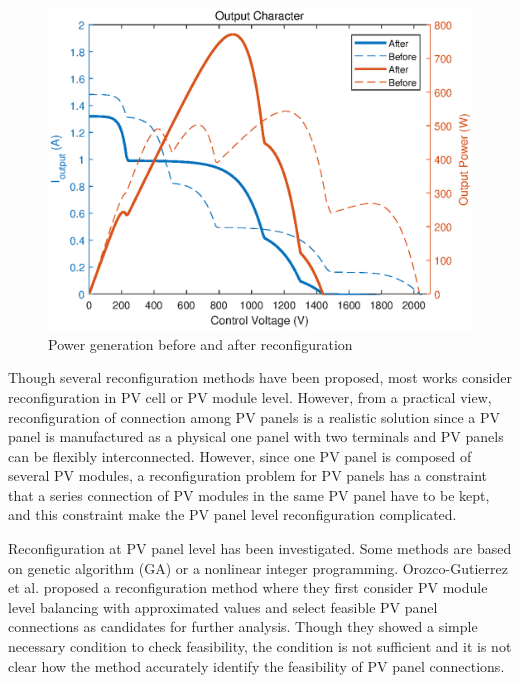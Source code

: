 \documentclass[conference]{IEEEtran}
\begin{document}
\begin{figure}
    \centering
    \includegraphics[width=0.6\linewidth]{fig/new_compare.eps}
    \caption{Power generation before and after reconfiguration}
    \label{compare}
\end{figure}


Though several reconfiguration methods have been proposed, most works consider reconfiguration in PV cell or PV module level\cite{storey2014optimized,udenze2018reconfiguration}.
However, from a practical view, reconfiguration of connection among PV panels is a realistic solution since a PV panel is manufactured as a physical one panel with two terminals and PV panels can be flexibly interconnected. However, since one PV panel is composed of several PV modules, a reconfiguration problem for PV panels has a constraint that a series connection of PV modules in the same PV panel have to be kept, and 
this constraint make the PV panel level reconfiguration complicated.



Reconfiguration at PV panel level has been investigated\cite{carotenuto2015evolutionary,hu2017non,orozco2016optimized}. 
Some methods are based on genetic algorithm (GA)\cite{carotenuto2015evolutionary} or a nonlinear integer programming\cite{hu2017non}.
Orozco-Gutierrez et al. proposed a reconfiguration method\cite{orozco2016optimized} where they first consider PV module level balancing with approximated values and select feasible PV panel connections as candidates for further analysis. 
Though they showed a simple necessary condition to check feasibility, the condition is not sufficient and it is not clear how the method accurately identify the feasibility of PV panel connections. 
\end{document}
